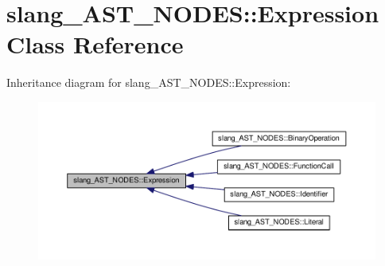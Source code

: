 \hypertarget{classslang__AST__NODES_1_1Expression}{}\section{slang\+\_\+\+A\+S\+T\+\_\+\+N\+O\+D\+ES\+:\+:Expression Class Reference}
\label{classslang__AST__NODES_1_1Expression}


Inheritance diagram for slang\+\_\+\+A\+S\+T\+\_\+\+N\+O\+D\+ES\+:\+:Expression\+:
\nopagebreak
\begin{figure}[H]
\begin{center}
\leavevmode
\includegraphics[width=350pt]{classslang__AST__NODES_1_1Expression__inherit__graph}
\end{center}
\end{figure}
